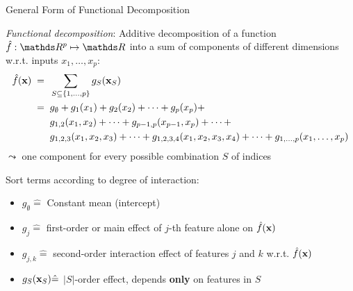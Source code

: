 \documentclass[10pt,compress,t,notes=noshow, xcolor=table]{beamer}
\newcommand{\open}{}
\newcommand{\close}{}
\begin{document}
\begin{frame}{General Form of Functional Decomposition
}


\begin{definition}
\textit{Functional decomposition}: Additive decomposition of a function $\fh: \R^p \mapsto \R$ into a sum of components of different dimensions w.r.t. inputs $x_1, \ldots, x_p$: 
\begin{equation*}
\begin{split}
\fh(\xv)
\; = \; \; & \sum_{S \subseteq \{1,\ldots,p\}} g_{S}(\xv_S) \\
\; = \; \; & g_{\open \emptyset \close} +
g_{\open 1 \close}(x_1) + g_{\open 2 \close}(x_2) + \dots + g_{\open p \close}(x_p) + \\
& g_{\open 1, 2 \close}(x_1, x_2) + \dots + g_{\open p-1, p \close}(x_{p-1}, x_p) + \dots + \\
& g_{\open 1, 2, 3 \close}(x_1, x_2, x_3) + \dots +
g_{\open 1, 2, 3, 4 \close}(x_1, x_2, x_3, x_4) + \dots +
g_{\open 1,\ldots,p \close}(x_1, \ldots, x_p)
\end{split}    
\end{equation*}
$\leadsto$ one component for every possible combination $S$ of indices
\end{definition}
Sort terms according to degree of interaction:
\begin{itemize}
\item $g_{\open \emptyset \close} \hat = $ Constant mean (intercept) %
\item $g_{\open j \close} \hat = $ first-order or main effect of $j$-th feature alone on $\hat{f}(\mathbf{x})$
\item $g_{\open j, k \close} \hat = $ second-order interaction effect of features $j$ and $k$ w.r.t. $\hat{f}(\mathbf{x})$%
\item $g_{S}(\mathbf{x}_S) \hat = $ $|S|$-order effect, depends \textbf{only} on features in $S$ %
\end{itemize}
\lz
\end{frame}
\end{document}

